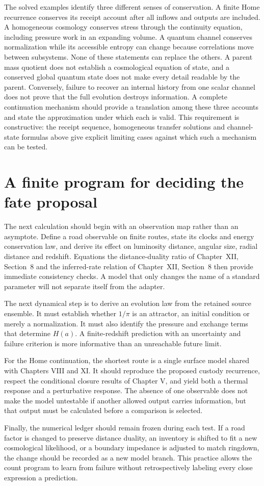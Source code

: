 The solved examples identify three different senses of conservation. A finite Home recurrence conserves its receipt account after all inflows and outputs are included. A homogeneous cosmology conserves stress through the continuity equation, including pressure work in an expanding volume. A quantum channel conserves normalization while its accessible entropy can change because correlations move between subsystems. None of these statements can replace the others. A parent mass quotient does not establish a cosmological equation of state, and a conserved global quantum state does not make every detail readable by the parent. Conversely, failure to recover an internal history from one scalar channel does not prove that the full evolution destroys information. A complete continuation mechanism should provide a translation among these three accounts and state the approximation under which each is valid. This requirement is constructive: the receipt sequence, homogeneous transfer solutions and channel-state formulas above give explicit limiting cases against which such a mechanism can be tested.

\section{A finite program for deciding the fate proposal}
The next calculation should begin with an observation map rather than an asymptote. Define a road observable on finite routes, state its clocks and energy conservation law, and derive its effect on luminosity distance, angular size, radial distance and redshift. Equations the distance-duality ratio of Chapter~XII, Section~8 and the inferred-rate relation of Chapter~XII, Section~8 then provide immediate consistency checks. A model that only changes the name of a standard parameter will not separate itself from the adapter.

The next dynamical step is to derive an evolution law from the retained source ensemble. It must establish whether $1/\pi$ is an attractor, an initial condition or merely a normalization. It must also identify the pressure and exchange terms that determine $H(a)$. A finite-redshift prediction with an uncertainty and failure criterion is more informative than an unreachable future limit.

For the Home continuation, the shortest route is a single surface model shared with Chapters VIII and XI. It should reproduce the proposed custody recurrence, respect the conditional closure results of Chapter V, and yield both a thermal response and a perturbative response. The absence of one observable does not make the model untestable if another allowed output carries information, but that output must be calculated before a comparison is selected.

Finally, the numerical ledger should remain frozen during each test. If a road factor is changed to preserve distance duality, an inventory is shifted to fit a new cosmological likelihood, or a boundary impedance is adjusted to match ringdown, the change should be recorded as a new model branch. This practice allows the count program to learn from failure without retrospectively labeling every close expression a prediction.

